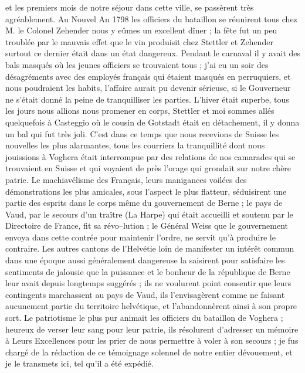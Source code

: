 \documentclass[12pt]{article}
\begin{document}
 et les premiers mois de notre séjour dans cette ville,
se passèrent très agréablement. Au Nouvel An 1798 les officiers du bataillon se réunirent tous chez
M. le Colonel Zehender nous y eûmes un excellent dîner ; la fête fut un peu troublée par le mauvais
effet que le vin produisit chez Stettler et Zehender surtout ce dernier était dans un état
dangereux. Pendant le carnaval il y avait des bals masqués où les jeunes officiers se trouvaient
tous ; j’ai eu un soir des désagréments avec des employés français qui étaient masqués en
perruquiers, et nous poudraient les habits, l’affaire aurait pu devenir sérieuse, si le Gouverneur
ne s’était donné la peine de tranquilliser les parties. L’hiver était superbe, tous les jours nous
allions nous promener en corps, Stettler et moi sommes allés quelquefois à Casteggio où le cousin de
Gotstadt était en détachement, il y donna un bal qui fut très joli. C’est dans ce temps que nous
recevions de Suisse les nouvelles les plus alarmantes, tous les courriers la tranquillité dont nous
jouissions à Voghera était interrompue par des relations de nos camarades qui se trouvaient en
Suisse et qui voyaient de près l’orage qui grondait sur notre chère patrie. Le machiavélisme des
Français, leurs manigances voilées des démonstrations les plus amicales, sous l’aspect le plus
flatteur, séduisirent une partie des esprits dans le corps même du gouvernement de Berne ; le pays
de Vaud, par le secours d’un traître (La Harpe) qui était accueilli et soutenu par le Directoire de
France, fit sa révo–lution ; le Général Weiss que le gouvernement envoya dans cette contrée pour
maintenir l’ordre, ne servit qu’à produire le contraire. Les autres cantons de l’Helvétie loin de
manifester un intérêt commun dans une époque aussi généralement dangereuse la saisirent pour
satisfaire les sentiments de jalousie que la puissance et le bonheur de la république de Berne leur
avait depuis longtemps suggérés ; ils ne voulurent point consentir que leurs contingents marchassent
au pays de Vaud, ils l’envisagèrent comme ne faisant aucunement partie du territoire helvétique, et
l’abandonnèrent ainsi à son propre sort. Le patriotisme le plus pur animait les officiers du
bataillon de Voghera ; heureux de verser leur sang pour leur patrie, ils résolurent d’adresser un
mémoire à Leurs Excellences pour les prier de nous permettre à voler à son secours ; je fus chargé
de la rédaction de ce témoignage solennel de notre entier dévouement, et je le transmets ici, tel
qu’il a été expédié.
\end{document}
